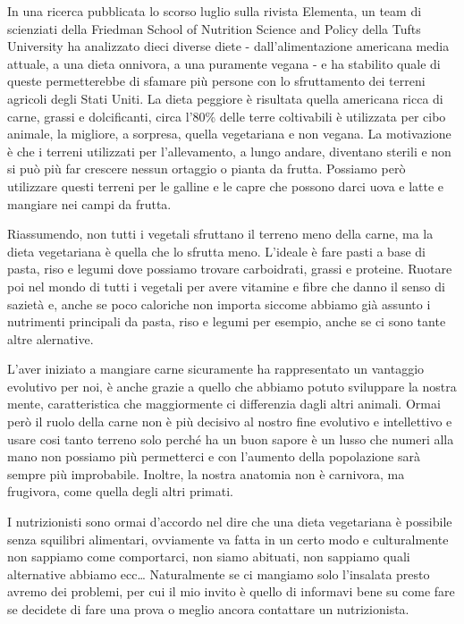 \documentclass[12pt]{book} %
\begin{document}
In una ricerca pubblicata lo scorso luglio sulla rivista Elementa, un team di scienziati della Friedman School of Nutrition Science
and Policy della Tufts University ha analizzato dieci diverse diete - dall'alimentazione americana media attuale, a una
dieta onnivora, a una puramente vegana - e ha stabilito quale di queste permetterebbe di sfamare più persone con lo
sfruttamento dei terreni agricoli degli Stati Uniti. La dieta peggiore è risultata quella americana ricca di carne,
grassi e dolcificanti, circa l'80\% delle terre coltivabili è utilizzata per cibo animale, la
migliore, a sorpresa, quella vegetariana e non vegana. La motivazione è che i terreni utilizzati per
l'allevamento, a lungo andare, diventano sterili e non si può più far crescere nessun ortaggio o
pianta da frutta. Possiamo però utilizzare questi terreni per le galline e le capre che possono darci uova e latte e
mangiare nei campi da frutta.

Riassumendo, non tutti i vegetali sfruttano il terreno meno della carne, ma la dieta vegetariana è quella che lo sfrutta
meno. L'ideale è fare pasti a base di pasta, riso e legumi dove possiamo trovare carboidrati,
grassi e proteine. Ruotare poi nel mondo di tutti i vegetali per avere vitamine e fibre che danno il senso di sazietà
e, anche se poco caloriche non importa siccome abbiamo già assunto i nutrimenti principali da pasta, riso e legumi per
esempio, anche se ci sono tante altre alernative.


\bigskip

L'aver iniziato a mangiare carne sicuramente ha rappresentato un vantaggio evolutivo per noi, è
anche grazie a quello che abbiamo potuto sviluppare la nostra mente, caratteristica che maggiormente ci differenzia
dagli altri animali. Ormai però il ruolo della carne non è più decisivo al nostro fine evolutivo e intellettivo e usare
cosi tanto terreno solo perché ha un buon sapore è un lusso che numeri alla mano non possiamo più permetterci e con
l'aumento della popolazione sarà sempre più improbabile. Inoltre, la nostra anatomia non è
carnivora, ma frugivora, come quella degli altri primati. 

I nutrizionisti sono ormai d'accordo nel dire che una dieta vegetariana è possibile senza squilibri
alimentari, ovviamente va fatta in un certo modo e culturalmente non sappiamo come comportarci, non siamo abituati, non
sappiamo quali alternative abbiamo ecc… Naturalmente se ci mangiamo solo l'insalata presto avremo
dei problemi, per cui il mio invito è quello di informavi bene su come fare se decidete di fare una prova o meglio
ancora contattare un nutrizionista.
\end{document}
